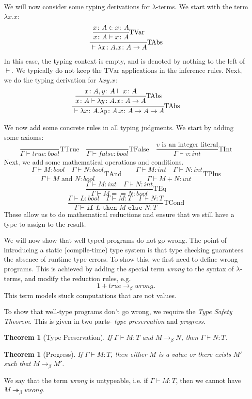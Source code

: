 \documentclass[a4paper, openany]{memoir}
\newcommand{\nfrac}[2]{
    {\displaystyle\frac{#1}{\strut #2}}
  \kern-\nulldelimiterspace}
\newtheorem{theorem}[proposition]{Theorem}
\theoremstyle{definition}
\begin{document}
    We will now consider some typing derivations for $\lambda$-terms. We start with the term $\lambda x.x$:
    \[\nfrac{\nfrac{x \colon A \in x \colon A}{x \colon A \vdash x \colon A} \textrm{TVar}}{\vdash \lambda x \colon A. x \colon A \to A} \textrm{TAbs}\]
    In this case, the typing context is empty, and is denoted by nothing to the left of $\vdash$. We typically do not keep the TVar applications in the inference rules. Next, we do the typing derivation for $\lambda xy.x$:
    \[\nfrac{\nfrac{x \colon A, y \colon A \vdash x \colon A}{x \colon A \vdash \lambda y \colon A.x \colon A \to A} \textrm{TAbs}}{\vdash \lambda x \colon A.\lambda y \colon A.x \colon A \to A \to A}\textrm{TAbs} \]

    We now add some concrete rules in all typing judgments. We start by adding some axioms:
    \[\frac{}{\Gamma \vdash \textit{true} \colon \textit{bool}} \textrm{TTrue} \quad \frac{}{\Gamma \vdash \textit{false} \colon \textit{bool}} \textrm{TFalse} \quad \frac{v \textrm{ is an integer literal}}{\Gamma \vdash v \colon \textit{int}} \textrm{TInt}\]
    Next, we add some mathematical operations and conditions.
    \[\frac{\Gamma \vdash M \colon \textit{bool} \quad \Gamma \vdash N \colon \textit{bool}}{\Gamma \vdash M \textrm{ and } N \colon \textit{bool}} \textrm{TAnd} \qquad \frac{\Gamma \vdash M \colon \textit{int} \quad \Gamma \vdash N \colon \textit{int}}{\Gamma \vdash M + N \colon \textit{int}} \textrm{TPlus}\]
    \[\frac{\Gamma \vdash M \colon \textit{int} \quad \Gamma \vdash N \colon \textit{int}}{\Gamma \vdash M == N \colon \textit{bool}} \textrm{TEq}\]
    \[\frac{\Gamma \vdash L \colon \textit{bool} \quad \Gamma \vdash M \colon T \quad \Gamma \vdash N \colon T}{\Gamma \vdash \texttt{if } L \texttt{ then } M \texttt{ else } N \colon T} \textrm{TCond}\]
    These allow us to do mathematical reductions and ensure that we still have a type to assign to the result.

    We will now show that well-typed programs do not go wrong. The point of introducing a static (compile-time) type system is that type checking guarantees the absence of runtime type errors. To show this, we first need to define wrong programs. This is achieved by adding the special term \textit{wrong} to the syntax of $\lambda$-terms, and modify the reduction rules, e.g. 
    \[1 + \textit{true} \to_\beta \textit{wrong}.\] 
    This term models stuck computations that are not values.

    To show that well-type programs don't go wrong, we require the \emph{Type Safety Theorem}. This is given in two parts- \emph{type preservation} and \emph{progress}.
    \begin{theorem}[Type Preservation]
        If $\Gamma \vdash M \colon T$ and $M \to_\beta N$, then $\Gamma \vdash N \colon T$.
    \end{theorem}
    \begin{theorem}[Progress]
        If $\Gamma \vdash M \colon T$, then either $M$ is a value or there exists $M'$ such that $M \to_\beta M'$.
    \end{theorem}
    \noindent We say that the term \textit{wrong} is untypeable, i.e. if $\Gamma \vdash M \colon T$, then we cannot have $M \twoheadrightarrow_\beta \textit{wrong}$.
\end{document}
